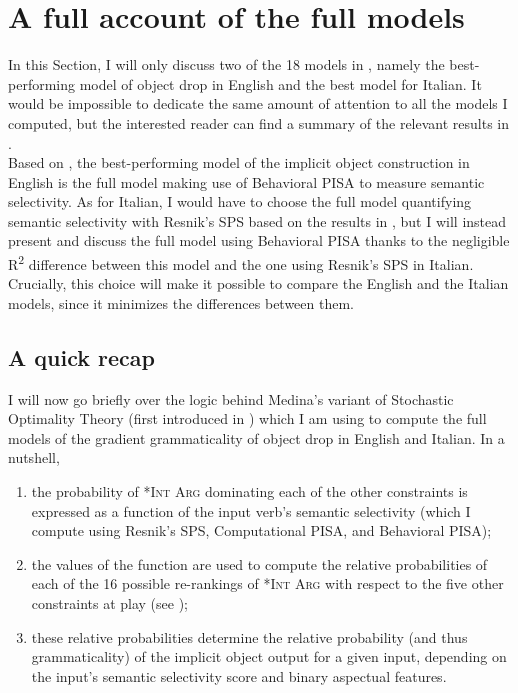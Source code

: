 \section{A full account of the full models} 
In this Section, I will only discuss two of the 18 models in , namely the best-performing model of object drop in English and the best model for Italian. It would be impossible to dedicate the same amount of attention to all the models I computed, but the interested reader can find a summary of the relevant results in .\\
Based on , the best-performing model of the implicit object construction in English is the full model making use of Behavioral PISA to measure semantic selectivity. As for Italian, I would have to choose the full model quantifying semantic selectivity with Resnik's SPS based on the results in , but I will instead present and discuss the full model using Behavioral PISA thanks to the negligible R\textsuperscript{2} difference between this model and the one using Resnik's SPS in Italian. Crucially, this choice will make it possible to compare the English and the Italian models, since it minimizes the differences between them.


\subsection{A quick recap} 

I will now go briefly over the logic behind Medina's variant of Stochastic Optimality Theory (first introduced in ) which I am using to compute the full models of the gradient grammaticality of object drop in English and Italian. In a nutshell,

\begin{enumerate}
    \item the probability of \textsc{*Int Arg} dominating each of the other constraints is expressed as a function of the input verb's semantic selectivity (which I compute using Resnik's SPS, Computational PISA, and Behavioral PISA);
    \item the values of the function are used to compute the relative probabilities of each of the 16 possible re-rankings of \textsc{*Int Arg} with respect to the five other constraints at play (see );
    \item these relative probabilities determine the relative probability (and thus grammaticality) of the implicit object output for a given input, depending on the input's semantic selectivity score and binary aspectual features.
\end{enumerate}

